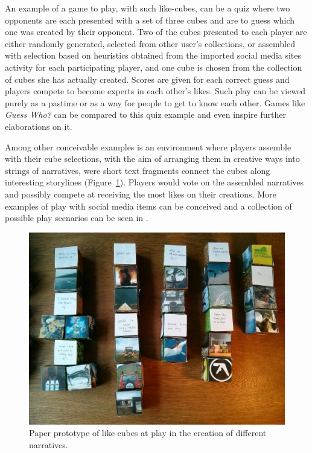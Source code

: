 \documentclass[conference]{IEEETran}
\begin{document}
An example of a game to play, with such like-cubes, can be a quiz where two opponents are each presented with a set of three cubes and are to guess which one was created by their opponent.  Two of the cubes presented to each player are either randomly generated, selected from other user's collections, or assembled with selection based on heuristics obtained from the imported social media sites activity for each participating player, and one cube is chosen from the collection of cubes she has actually created.  Scores are given for each correct guess and players compete to become experts in each other's likes.  Such play can be viewed purely as a pastime or as a way for people to get to know each other.  Games like \textit{Guess Who?}\cite{GuessWho} can be compared to this quiz example and even inspire further elaborations on it.

Among other conceivable examples is an environment where players assemble with their cube selections, with the aim of arranging them in creative ways into strings of narratives, were short text fragments connect the cubes along interesting storylines (Figure~\ref{fig:narratives}).  Players would vote on the assembled narratives and possibly compete at receiving the most likes on their creations.  More examples of play with social media items can be conceived and a collection of possible play scenarios can be seen in \cite{GoLplay}.

\begin{figure}[htp]
	\centerline{\includegraphics[width=\columnwidth]{IMG_20141029_110139.jpg}}
	\caption{Paper prototype of like-cubes at play in the creation of different narratives.}
	\label{fig:narratives}
\end{figure}
\end{document}
